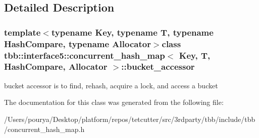 \subsection{Detailed Description}
\subsubsection*{template$<$typename Key, typename T, typename Hash\+Compare, typename Allocator$>$class tbb\+::interface5\+::concurrent\+\_\+hash\+\_\+map$<$ Key, T, Hash\+Compare, Allocator $>$\+::bucket\+\_\+accessor}

bucket accessor is to find, rehash, acquire a lock, and access a bucket 

The documentation for this class was generated from the following file\+:\begin{DoxyCompactItemize}
\item 
/\+Users/pourya/\+Desktop/platform/repos/tetcutter/src/3rdparty/tbb/include/tbb/concurrent\+\_\+hash\+\_\+map.\+h\end{DoxyCompactItemize}
